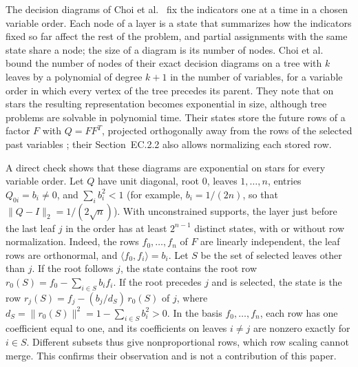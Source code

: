 \begin{remark}\label{rem:dd-star}
The decision diagrams of Choi et al.\ \cite{ChoiDiagrams} fix the
indicators one at a time in a chosen variable order. Each node of a
layer is a state that summarizes how the indicators fixed so far affect
the rest of the problem, and partial assignments with the same state
share a node; the size of a diagram is its number of nodes. Choi et al.\
\cite[Section~7.2 and Corollary~1]{ChoiDiagrams} bound the number of
nodes of their exact decision diagrams on a tree with $k$ leaves by a
polynomial of degree $k+1$ in the number of variables, for a variable
order in which every vertex of the tree precedes its parent. They note
that on stars the resulting representation becomes exponential in size,
although tree problems are solvable in polynomial time. Their states
store the future rows of a factor $F$ with $Q=FF^T$, projected
orthogonally away from the rows of the selected past variables
\cite[Definition~7 and Lemma~2]{ChoiDiagrams}; their Section~EC.2.2
also allows normalizing each stored row.

A direct check shows that these diagrams are exponential on stars for
every variable order. Let $Q$ have unit diagonal, root $0$, leaves
$1,\ldots,n$, entries $Q_{0i}=b_i\ne0$, and $\sum_ib_i^2<1$ (for
example, $b_i=1/(2n)$, so that $\|Q-I\|_2=1/(2\sqrt n)$). With
unconstrained supports, the layer just before the last leaf $j$ in the
order has at least $2^{n-1}$ distinct states, with or without row
normalization. Indeed, the rows $f_0,\ldots,f_n$ of $F$ are linearly
independent, the leaf rows are orthonormal, and
$\langle f_0,f_i\rangle=b_i$. Let $S$ be the set of selected leaves
other than $j$. If the root follows $j$, the state contains the root row
$r_0(S)=f_0-\sum_{i\in S}b_if_i$. If the root precedes $j$ and is
selected, the state is the row $r_j(S)=f_j-(b_j/d_S)\,r_0(S)$ of $j$,
where $d_S=\|r_0(S)\|^2=1-\sum_{i\in S}b_i^2>0$. In the basis
$f_0,\ldots,f_n$, each row has one coefficient equal to one, and its
coefficients on leaves $i\ne j$ are nonzero exactly for $i\in S$.
Different subsets thus give nonproportional rows, which row scaling
cannot merge. This confirms their observation and is not a contribution
of this paper.
\end{remark}

